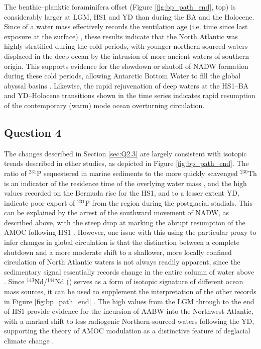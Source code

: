 The benthic--planktic foraminifera \fC{} offset (Figure \ref{fig:bp_path_end}, top) is considerably larger at LGM, HS1 and YD than during the BA and the Holocene.
Since \BP{} of a water mass effectively records the ventilation age (i.e. time since last exposure at the surface) \parencite{lynch2014tracers}, these results indicate that the North Atlantic was highly stratified during the cold periods, with younger northern sourced waters displaced in the deep ocean by the intrusion of more ancient waters of southern origin.
This supports evidence for the slowdown or shutoff of NADW formation during these cold periods, allowing Antarctic Bottom Water to fill the global abyssal basins \parencite{boyle1985comparison, bard1994north, thornalley2011deglacial}.
Likewise, the rapid rejuvenation of deep waters at the HS1--BA and YD--Holocene transitions shown in the \BP{} time series indicates rapid resumption of the contemporary (warm) mode ocean overturning circulation.

\subsection{Question 4}
\label{sec:Q2.4}
The \BP{} changes described in Section \ref{sec:Q2.3} are largely consistent with isotopic trends described in other studies, as depicted in Figure \ref{fig:bp_path_end}.
The ratio of $^{231}$P sequestered in marine sediments to the more quickly scavenged $^{230}$Th is an indicator of the residence time of the overlying water mass \parencite{lynch2014tracers}, and the high values recorded on the Bermuda rise for the HS1, and to a lesser extent YD, indicate poor export of $^{231}$P from the region during the postglacial stadials.
This can be explained by the arrest of the southward movement of NADW, as described above, with the steep \PaTh{} drop at  marking the abrupt resumption of the AMOC following HS1 \parencite{mcmanus2004collapse}.
However, one issue with this using the particular proxy to infer changes in global circulation is that the distinction between a complete shutdown and a more moderate shift to a shallower, more locally confined circulation of North Atlantic waters is not always readily apparent, since the sedimentary \PaTh{} signal essentially records change in the entire column of water above \parencite{roberts2010synchronous}. 
Since $^{143}$Nd/$^{144}$Nd (\eNd{}) serves as a form of isotopic signature of different ocean mass sources, it can be used to supplement the interpretation of the other records in Figure \ref{fig:bp_path_end} \parencite{lynch2014tracers}. 
The high values from the LGM through to the end of HS1 provide evidence for the incursion of AABW into the Northwest Atlantic, with a marked shift to less radiogenic Northern-sourced waters following the YD, supporting the theory of AMOC modulation as a distinctive feature of deglacial climate change \parencite{roberts2010synchronous}.

